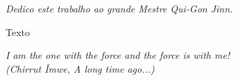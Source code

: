 \begin{dedicatoria}
   \vspace*{\fill}
   \begin{flushright}
   
   \textit{Dedico este trabalho ao grande Mestre Qui‑Gon Jinn.}
   
   \end{flushright}
\end{dedicatoria}

\begin{agradecimentos}

Texto

\end{agradecimentos}

\begin{epigrafe}
    \vspace*{\fill}
	\begin{flushright}
    
		\textit{I am the one with the force and the force is with me!\\
									(Chirrut Îmwe, A long time ago...)}
	\end{flushright}
\end{epigrafe}